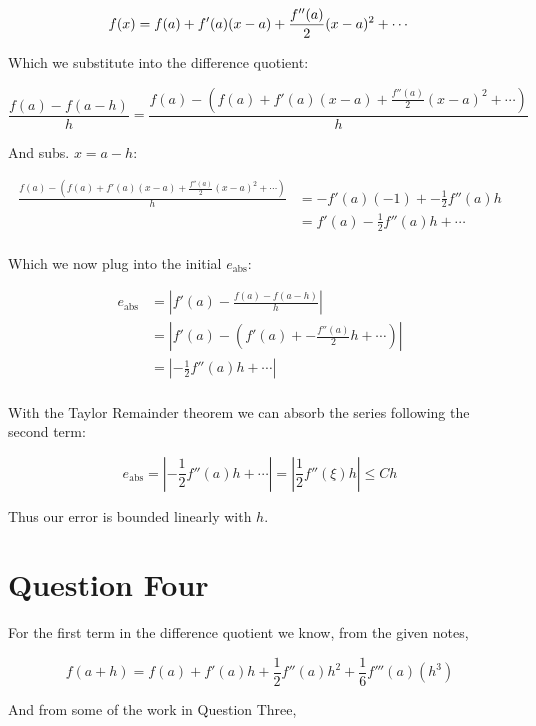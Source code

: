 \documentclass[11pt]{article}
\begin{document}
\begin{equation*}
f(x) = f(a) + f'(a)(x-a) + \frac{f''(a)}{2}(x-a)^2 + \cdots \\
\end{equation*}

Which we substitute into the difference quotient:

\begin{equation*}
\frac{f(a) - f(a - h)}{h} = \frac{f(a) - (f(a) + f'(a)(x-a) + \frac{f''(a)}{2}(x-a)^2 + \cdots)}{h}
\end{equation*}

And subs. \(x=a-h\):

\begin{align*}
\frac{f(a) - (f(a) + f'(a)(x-a) + \frac{f''(a)}{2}(x-a)^2 + \cdots)}{h} &= -f'(a)(-1) + -\frac{1}{2}f''(a)h \\
&= f'(a) - \frac{1}{2}f''(a)h + \cdots \\
\end{align*}

Which we now plug into the initial \(e_{\text{abs}}\):

\begin{align*}
e_{\text{abs}} &= |f'(a) - \frac{f(a) - f(a - h)}{h}| \\
&= |f'(a) - (f'(a) +  -\frac{f''(a)}{2}h + \cdots)| \\
&= |- \frac{1}{2}f''(a)h + \cdots | \\
\end{align*}

With the Taylor Remainder theorem we can absorb the series following the second term:

\begin{equation*}
e_{\text{abs}} = |- \frac{1}{2}f''(a)h + \cdots | = |\frac{1}{2}f''(\xi)h| \leq Ch
\end{equation*}

Thus our error is bounded linearly with \(h\).

\section{Question Four}
\label{sec:orga7d02a2}
For the first term in the difference quotient we know, from the given notes,

\begin{equation*}
f(a+h) = f(a) + f'(a)h + \frac{1}{2}f''(a)h^2 + \frac{1}{6}f'''(a)(h^3)
\end{equation*}

And from some of the work in Question Three,
\end{document}
